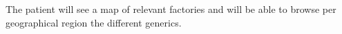 The patient will see a map of relevant factories and will be able to browse per geographical region the different generics.
